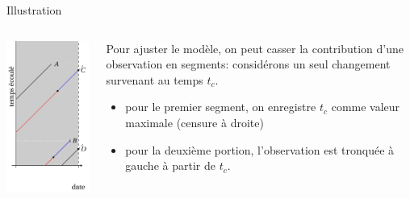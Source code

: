 \documentclass[
  ignorenonframetext,
]{beamer}
\providecommand{\tightlist}{%
  \setlength{\itemsep}{0pt}\setlength{\parskip}{0pt}}\usepackage{longtable,booktabs,array}
\begin{document}
\begin{frame}{Illustration}
\protect\hypertarget{illustration}{}
\begin{columns}[T]
\begin{column}{0.4\textwidth}
\includegraphics{figures/Lexis_censure_modif.pdf}
\end{column}

\begin{column}{0.6\textwidth}
Pour ajuster le modèle, on peut casser la contribution d'une observation
en segments: considérons un seul changement survenant au temps \(t_c\).

\begin{itemize}
\tightlist
\item
  pour le premier segment, on enregistre \(t_c\) comme valeur maximale
  (censure à droite)
\item
  pour la deuxième portion, l'observation est tronquée à gauche à partir
  de \(t_c\).
\end{itemize}
\end{column}
\end{columns}
\end{frame}
\end{document}

